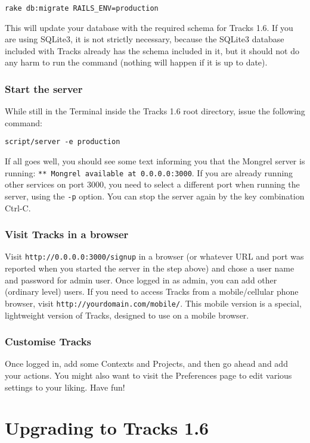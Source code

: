 \documentclass[10pt,twoside]{memoir}
\begin{document}
\texttt{rake db:migrate RAILS\_ENV=production}


This will update your database with the required schema for Tracks 1.6. If you are using SQLite3, it is not strictly necessary, because the SQLite3 database included with Tracks already has the schema included in it, but it should not do any harm to run the command (nothing will happen if it is up to date).


\subsection{Start the server}
\label{startserver_install}

While still in the Terminal inside the Tracks 1.6 root directory, issue the following command:


\texttt{script/server -e production}


If all goes well, you should see some text informing you that the Mongrel server is running: \texttt{** Mongrel available at 0.0.0.0:3000}. If you are already running other services on port 3000, you need to select a different port when running the server, using the \texttt{-p} option. You can stop the server again by the key combination Ctrl-C.


\subsection{Visit Tracks in a browser}
\label{signup_install}

Visit \texttt{http://0.0.0.0:3000/signup} in a browser (or whatever URL and port was reported when you started the server in the step above) and chose a user name and password for admin user. Once logged in as admin, you can add other (ordinary level) users. If you need to access Tracks from a mobile/cellular phone browser, visit \texttt{http://yourdomain.com/mobile/}. This mobile version is a special, lightweight version of Tracks, designed to use on a mobile browser.


\subsection{Customise Tracks}
\label{customise_install}

Once logged in, add some Contexts and Projects, and then go ahead and add your actions. You might also want to visit the Preferences page to edit various settings to your liking. Have fun!


\chapter{Upgrading to Tracks 1.6}
\label{upgrading}
\end{document}
